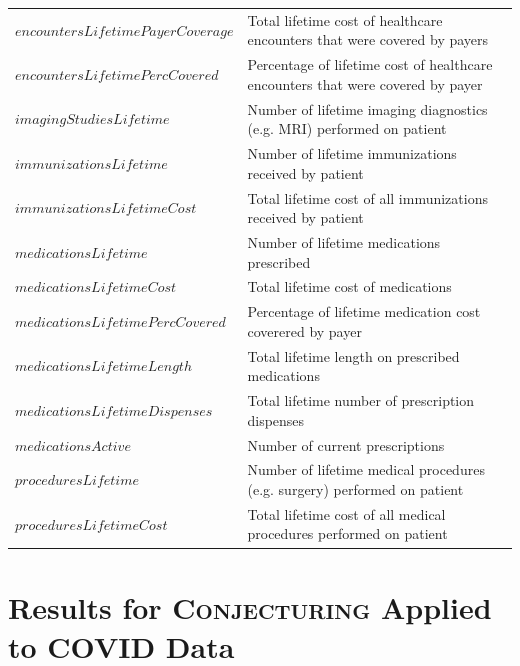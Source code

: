 \documentclass[ijds,nonblindrev]{informs-ijds}
\begin{document}
\begin{APPENDICES}
\begin{table} [!ht]
\begin{tabular}{l|p{4.0in}}
$encountersLifetimePayerCoverage$ & Total lifetime cost of healthcare encounters that were covered by payers \\
$encountersLifetimePercCovered$ & Percentage of lifetime cost of healthcare encounters that were covered by payer\\
$imagingStudiesLifetime$ & Number of lifetime imaging diagnostics (e.g. MRI) performed on patient\\
$immunizationsLifetime$ & Number of lifetime immunizations received by patient \\
$immunizationsLifetimeCost$ & Total lifetime cost of all immunizations received by patient\\
$medicationsLifetime$ & Number of lifetime medications prescribed \\
$medicationsLifetimeCost$ & Total lifetime cost of medications\\
$medicationsLifetimePercCovered$ & Percentage of lifetime medication cost coverered by payer\\
$medicationsLifetimeLength$ & Total lifetime length on prescribed medications\\
$medicationsLifetimeDispenses$ & Total lifetime number of prescription dispenses\\
$medicationsActive$ & Number of current prescriptions \\
$proceduresLifetime$ & Number of lifetime medical procedures (e.g. surgery) performed on patient\\
$proceduresLifetimeCost$ & Total lifetime cost of all medical procedures performed on patient\\
\hline
\end{tabular}
\end{table}
\newpage

\section{Results for \textsc{Conjecturing} Applied to COVID Data}


\end{APPENDICES}
\end{document}
